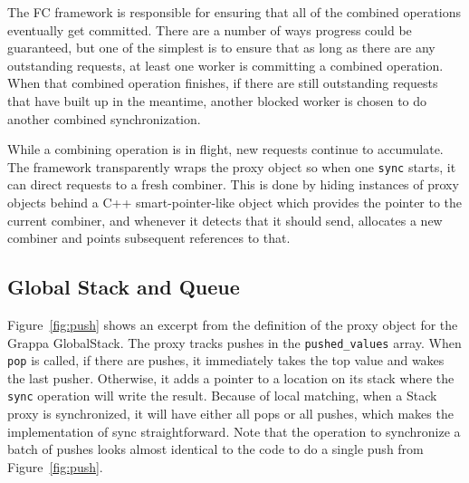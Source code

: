 The FC framework is responsible for ensuring that all of the combined operations eventually get committed. There are a number of ways progress could be guaranteed, but one of the simplest is to ensure that as long as there are any outstanding requests, at least one worker is committing a combined operation.
When that combined operation finishes, if there are still outstanding requests that have built up in the meantime, another blocked worker is chosen to do another combined synchronization.


While a combining operation is in flight, new requests continue to accumulate. The framework transparently wraps the proxy object so when one \texttt{sync} starts, it can direct requests to a fresh combiner.
This is done by hiding instances of proxy objects behind a C++ smart-pointer-like object which provides the pointer to the current combiner, and whenever it detects that it should send, allocates a new combiner and points subsequent references to that.

\subsection{Global Stack and Queue}
Figure~\ref{fig:push} shows an excerpt from the definition of the proxy object for the Grappa GlobalStack. The proxy tracks pushes in the \texttt{pushed\_values} array. When \texttt{pop} is called, if there are pushes, it immediately takes the top value and wakes the last pusher. Otherwise, it adds a pointer to a location on its stack where the \texttt{sync} operation will write the result. Because of local matching, when a Stack proxy is synchronized, it will have either all pops or all pushes, which makes the implementation of sync straightforward. Note that the operation to synchronize a batch of pushes looks almost identical to the code to do a single push from Figure~\ref{fig:push}.

